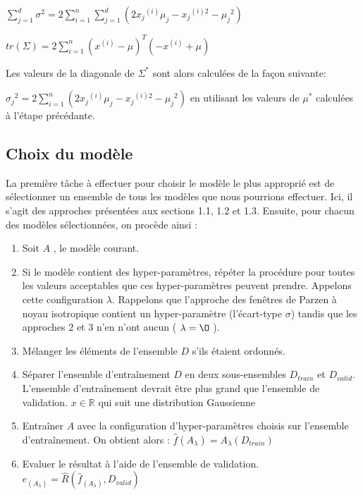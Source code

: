 \documentclass[a4paper,10pt]{article}
\begin{document}
$ \sum_{j = 1}^{d} \sigma^2 = 2 \sum_{i = 1}^{n} \sum_{j = 1}^{d} (2 {x_j}^{(i)}  \mu_j - {x_j}^{(i)2} - {\mu_j}^2)$

$tr(\Sigma) = 2 \sum_{i = 1}^{n} (x^{(i)} - \mu)^{T}(-x^{(i)}+\mu)$

Les valeurs de la diagonale de $\Sigma^*$ sont alors calculées de la façon suivante:

$ {\sigma_j}^2 = 2 \sum_{i = 1}^{n}(2 {x_j}^{(i)}  \mu_j - {x_j}^{(i)2} - {\mu_j}^2)$ en utilisant les valeurs de $\mu^*$ calculées à l'étape précédante.

\subsection{Choix du modèle}

La première tâche à effectuer pour choisir le modèle le plus approprié est de sélectionner un ensemble de tous les modèles que nous pourrions effectuer. Ici, il s'agit des approches présentées aux sections 1.1, 1.2 et 1.3. Ensuite, pour chacun des modèles sélectionnées, on procède ainsi :

\begin{enumerate}
	\item Soit $A$ , le modèle courant.
	\item Si le modèle contient des hyper-paramètres, répéter la procédure pour toutes les valeurs acceptables que ces hyper-paramètres peuvent prendre. Appelons cette configuration $\lambda$. Rappelons que l'approche des fenêtres de Parzen à noyau isotropique contient un hyper-paramètre (l'écart-type $\sigma$) tandis que les approches 2 et 3 n'en n'ont aucun ( $\lambda= \O$ ).
	\item Mélanger les éléments de l'ensemble $D$ s'ils étaient ordonnés.
	\item Séparer l'ensemble d'entraînement $D$ en deux sous-ensembles $D_{train}$ et $D_{valid}$. L'ensemble d’entraînement devrait être plus grand que l'ensemble de validation. $x \in \mathds{R}$ qui suit une distribution Gaussienne
	\item Entraîner $A$ avec la configuration d'hyper-paramètres choisis sur l'ensemble d'entraînement. On obtient alors : $\widehat{f} (A_{\lambda})=A_{\lambda}(D_{train})$
	\item Evaluer le résultat à l'aide de l'ensemble de validation. $e_{(A_{\lambda})} = \widehat{R} ( \widehat{f}_{(A_{\lambda})} , D_{valid} )$
\end{enumerate}
\end{document}
